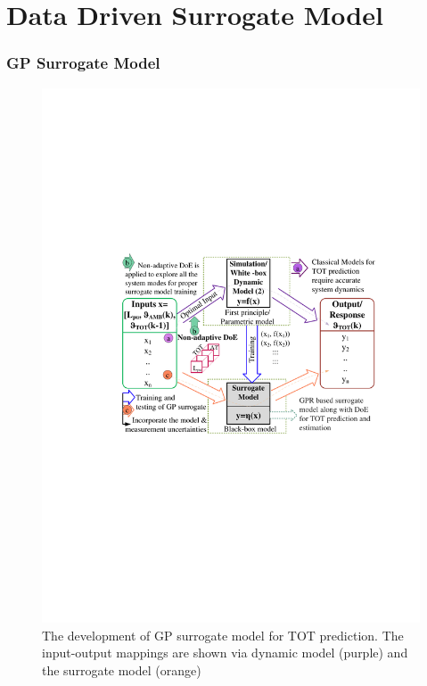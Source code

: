 \documentclass[10pt,hyperref={pdfpagelabels=false}]{beamer}
\begin{document}
\section{Data Driven Surrogate Model}
\begin{frame}[fragile]
\frametitle{GP Surrogate Model}
\begin{figure}
    \centering
    \includegraphics[scale=0.6]{Images/1_updated_TOTO_Pred_Else_r3.pdf}
    \caption{The development of GP surrogate model for TOT prediction. The input-output mappings are shown via dynamic model (purple) and the surrogate model (orange)}
    \label{fig:Problem_5_1_1}
\end{figure}

\end{frame}

\end{document}
